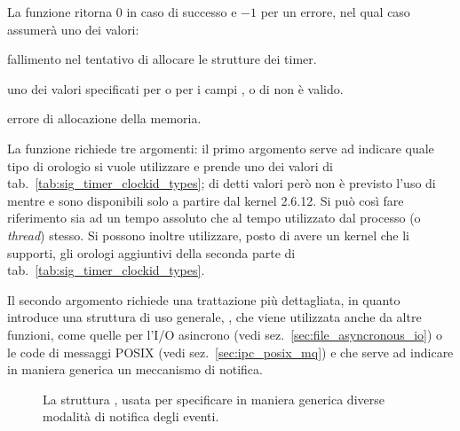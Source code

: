 \begin{funcproto}{
}

{La funzione ritorna $0$ in caso di successo e $-1$ per un errore, nel qual
  caso  assumerà uno dei valori: 
  \begin{errlist}
  \item[\errcode{EAGAIN}] fallimento nel tentativo di allocare le strutture
    dei timer.
  \item[\errcode{EINVAL}] uno dei valori specificati per  o per
    i campi ,  o
     di  non è valido.
  \item[\errcode{ENOMEM}] errore di allocazione della memoria.
  \end{errlist}
}
\end{funcproto}

La funzione richiede tre argomenti: il primo argomento serve ad indicare quale
tipo di orologio si vuole utilizzare e prende uno dei valori di
tab.~\ref{tab:sig_timer_clockid_types}; di detti valori però non è previsto
l'uso di  mentre
 e  sono
disponibili solo a partire dal kernel 2.6.12. Si può così fare riferimento sia
ad un tempo assoluto che al tempo utilizzato dal processo (o \textit{thread})
stesso. Si possono inoltre utilizzare, posto di avere un kernel che li
supporti, gli orologi aggiuntivi della seconda parte di
tab.~\ref{tab:sig_timer_clockid_types}. 

Il secondo argomento richiede una trattazione più dettagliata, in quanto
introduce una struttura di uso generale, , che viene
utilizzata anche da altre funzioni, come quelle per l'I/O asincrono (vedi
sez.~\ref{sec:file_asyncronous_io}) o le code di messaggi POSIX (vedi
sez.~\ref{sec:ipc_posix_mq}) e che serve ad indicare in maniera generica un
meccanismo di notifica.

\begin{figure}[!htb]
  \footnotesize \centering
  \begin{minipage}[c]{0.8\textwidth}
  \end{minipage} 
  \normalsize 
  \caption{La struttura , usata per specificare in maniera
    generica diverse modalità di notifica degli eventi.}
  \label{fig:struct_sigevent}
\end{figure}

